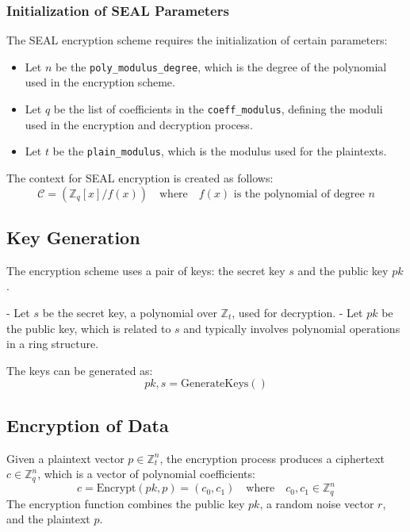 \documentclass[conference]{IEEEtran}
\begin{document}
\subsubsection{Initialization of SEAL Parameters}

The SEAL encryption scheme requires the initialization of certain parameters:

\begin{itemize}
    \item Let \( n \) be the \texttt{poly\_modulus\_degree}, which is the degree of the polynomial used in the encryption scheme.
    \item Let \( q \) be the list of coefficients in the \texttt{coeff\_modulus}, defining the moduli used in the encryption and decryption process.
    \item Let \( t \) be the \texttt{plain\_modulus}, which is the modulus used for the plaintexts.
\end{itemize}

The context for SEAL encryption is created as follows:
\[
\mathcal{C} = (\mathbb{Z}_q[x] / f(x)) \quad \text{where} \quad f(x) \text{ is the polynomial of degree } n
\]

\subsection{Key Generation}

The encryption scheme uses a pair of keys: the secret key \( s \) and the public key \( pk \).

- Let \( s \) be the secret key, a polynomial over \( \mathbb{Z}_t \), used for decryption.
- Let \( pk \) be the public key, which is related to \( s \) and typically involves polynomial operations in a ring structure.

The keys can be generated as:
\[
pk, s = \text{GenerateKeys}()
\]

\subsection{Encryption of Data}

Given a plaintext vector \( p \in \mathbb{Z}_t^n \), the encryption process produces a ciphertext \( c \in \mathbb{Z}_q^n \), which is a vector of polynomial coefficients:
\[
c = \text{Encrypt}(pk, p) = (c_0, c_1) \quad \text{where} \quad c_0, c_1 \in \mathbb{Z}_q^n
\]
The encryption function combines the public key \( pk \), a random noise vector \( r \), and the plaintext \( p \).
\end{document}
